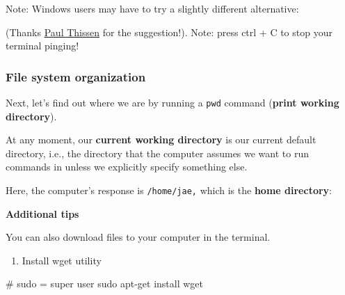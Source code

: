 \documentclass[
  letterpaper,
  DIV=11,
  numbers=noendperiod]{scrreprt}
\newenvironment{Shaded}{\begin{snugshade}}{\end{snugshade}}
\newcommand{\AttributeTok}[1]{\textcolor[rgb]{0.40,0.45,0.13}{#1}}
\newcommand{\CommentTok}[1]{\textcolor[rgb]{0.37,0.37,0.37}{#1}}
\newcommand{\ExtensionTok}[1]{\textcolor[rgb]{0.00,0.23,0.31}{#1}}
\newcommand{\FunctionTok}[1]{\textcolor[rgb]{0.28,0.35,0.67}{#1}}
\newcommand{\NormalTok}[1]{\textcolor[rgb]{0.00,0.23,0.31}{#1}}
\providecommand{\tightlist}{%
  \setlength{\itemsep}{0pt}\setlength{\parskip}{0pt}}\usepackage{longtable,booktabs,array}
\begin{document}
Note: Windows users may have to try a slightly different alternative:

\begin{Shaded}
\end{Shaded}

(Thanks \href{http://www.paulthissen.org/}{Paul Thissen} for the
suggestion!). Note: press ctrl + C to stop your terminal pinging!

\hypertarget{file-system-organization}{%
\subsubsection*{File system
organization}\label{file-system-organization}}

Next, let's find out where we are by running a \texttt{pwd} command
(\textbf{print working directory}).

At any moment, our \textbf{current working directory} is our current
default directory, i.e., the directory that the computer assumes we want
to run commands in unless we explicitly specify something else.

Here, the computer's response is \texttt{/home/jae,} which is the
\textbf{home directory}:

\begin{Shaded}
\end{Shaded}

\textbf{Additional tips}

You can also download files to your computer in the terminal.

\begin{enumerate}
\def\labelenumi{\arabic{enumi}.}
\tightlist
\item
  Install wget utility
\end{enumerate}

\begin{Shaded}
\begin{Highlighting}[]
\CommentTok{\# sudo = super user }
\FunctionTok{sudo}\NormalTok{ apt{-}get install wget }
\end{Highlighting}
\end{Shaded}
\end{document}
